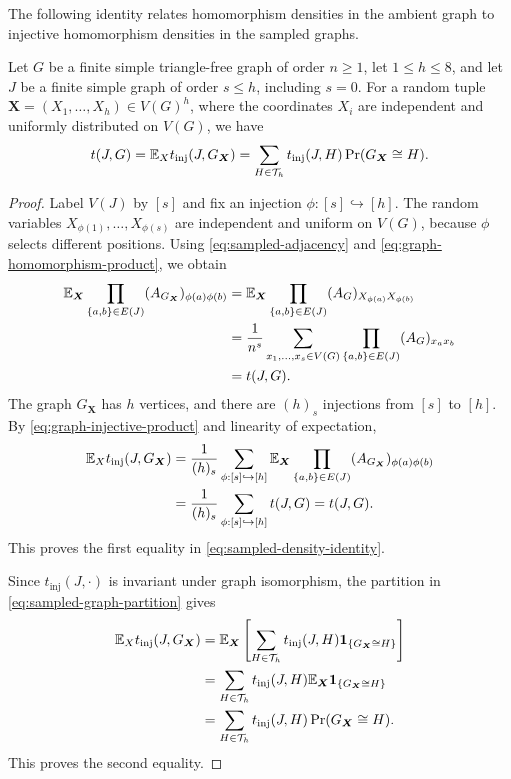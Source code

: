The following identity relates homomorphism densities in the ambient
graph to injective homomorphism densities in the sampled graphs.
\begin{lemma}\label{lem:sampled-density-identity}
Let $G$ be a finite simple triangle-free graph of order $n\geq1$,
let $1\leq h\leq8$, and let $J$ be a finite simple graph of order
$s\leq h$, including $s=0$.
For a random tuple $\boldsymbol{X}=(X_1,\ldots,X_h)\in V(G)^h$, where the coordinates
$X_i$ are independent and uniformly distributed on $V(G)$, we have
\begin{equation}\label{eq:sampled-density-identity}
t(J,G)=\mathbb E_Xt_{\mathrm{inj}}(J,G_{\boldsymbol{X}})
=\sum_{H\in\mathcal T_h}t_{\mathrm{inj}}(J,H)\Pr(G_{\boldsymbol{X}}\cong H).
\end{equation}
\end{lemma}
\begin{proof}
Label $V(J)$ by $[s]$ and fix an injection $\phi:[s]\hookrightarrow[h]$.
The random variables $X_{\phi(1)},\ldots,X_{\phi(s)}$ are independent
and uniform on $V(G)$, because $\phi$ selects different positions.
Using \eqref{eq:sampled-adjacency} and
\eqref{eq:graph-homomorphism-product}, we obtain
\begin{align*}
\mathbb E_{\boldsymbol{X}}\prod_{\{a,b\}\in E(J)}(A_{G_{\boldsymbol{X}}})_{\phi(a)\phi(b)}
&=\mathbb E_{\boldsymbol{X}}\prod_{\{a,b\}\in E(J)}(A_G)_{X_{\phi(a)}X_{\phi(b)}}\\
&=\frac1{n^s}\sum_{x_1,\ldots,x_s\in V(G)}
  \prod_{\{a,b\}\in E(J)}(A_G)_{x_ax_b}\\
&=t(J,G).
\end{align*}
The graph $G_{\boldsymbol{X}}$ has $h$ vertices, and there are $(h)_s$ injections
from $[s]$ to $[h]$.
By \eqref{eq:graph-injective-product} and linearity of expectation,
\begin{align*}
\mathbb E_Xt_{\mathrm{inj}}(J,G_{\boldsymbol{X}})
&=\frac1{(h)_s}\sum_{\phi:[s]\hookrightarrow[h]}
  \mathbb E_{\boldsymbol{X}}\prod_{\{a,b\}\in E(J)}(A_{G_{\boldsymbol{X}}})_{\phi(a)\phi(b)}\\
&=\frac1{(h)_s}\sum_{\phi:[s]\hookrightarrow[h]}t(J,G)
=t(J,G).
\end{align*}
This proves the first equality in \eqref{eq:sampled-density-identity}.

Since $t_{\mathrm{inj}}(J,\cdot)$ is invariant under graph isomorphism,
the partition in \eqref{eq:sampled-graph-partition} gives
\begin{align*}
\mathbb E_Xt_{\mathrm{inj}}(J,G_{\boldsymbol{X}})
&=\mathbb E_{\boldsymbol{X}}\left[\sum_{H\in\mathcal T_h}
  t_{\mathrm{inj}}(J,H)\mathbf 1_{\{G_{\boldsymbol{X}}\cong H\}}\right]\\
&=\sum_{H\in\mathcal T_h}t_{\mathrm{inj}}(J,H)
  \mathbb E_{\boldsymbol{X}}\mathbf 1_{\{G_{\boldsymbol{X}}\cong H\}}\\
&=\sum_{H\in\mathcal T_h}t_{\mathrm{inj}}(J,H)\Pr(G_{\boldsymbol{X}}\cong H).
\end{align*}
This proves the second equality.
\end{proof}

